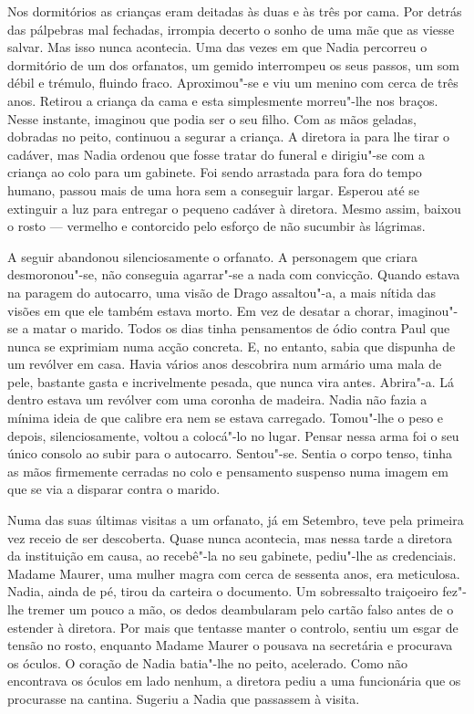 Nos dormitórios as crianças eram deitadas às duas e às três por cama.
Por detrás das pálpebras mal fechadas, irrompia decerto o sonho de uma
mãe que as viesse salvar. Mas isso nunca acontecia. Uma das vezes em que
Nadia percorreu o dormitório de um dos orfanatos, um gemido interrompeu
os seus passos, um som débil e trémulo, fluindo fraco. Aproximou"-se e
viu um menino com cerca de três anos. Retirou a criança da cama e esta
simplesmente morreu"-lhe nos braços. Nesse instante, imaginou que podia
ser o seu filho. Com as mãos geladas, dobradas no peito, continuou a
segurar a criança. A diretora ia para lhe tirar o cadáver, mas Nadia
ordenou que fosse tratar do funeral e dirigiu"-se com a criança ao colo
para um gabinete. Foi sendo arrastada para fora do tempo humano,
passou mais de uma hora sem a conseguir largar. Esperou até se extinguir
a luz para entregar o pequeno cadáver à diretora. Mesmo assim, baixou o
rosto --- vermelho e contorcido pelo esforço de não sucumbir às lágrimas.

A seguir abandonou silenciosamente o orfanato. A personagem que criara desmoronou"-se, não conseguia agarrar"-se a nada com
convicção. Quando estava na paragem do autocarro, uma visão de Drago
assaltou"-a, a mais
nítida das visões em que ele também estava morto. Em vez de desatar a
chorar, imaginou"-se a matar o marido. Todos os dias tinha pensamentos de
ódio contra Paul que nunca se exprimiam numa acção concreta. E, no
entanto, sabia que dispunha de um revólver em casa. Havia vários anos
descobrira num armário uma mala de pele, bastante gasta e incrivelmente
pesada, que nunca vira antes. Abrira"-a. Lá dentro estava um revólver com
uma coronha de madeira. Nadia não fazia a mínima ideia de que calibre
era nem se estava carregado. Tomou"-lhe o peso e depois, silenciosamente, voltou a colocá"-lo no lugar. Pensar nessa arma foi o seu único
consolo ao subir para o autocarro. Sentou"-se. Sentia o corpo tenso,
tinha as mãos firmemente cerradas no colo e pensamento suspenso numa
imagem em que se via a disparar contra o marido.

Numa das suas últimas visitas a um orfanato, já em
Setembro, teve pela primeira vez receio de ser descoberta. Quase nunca
acontecia, mas nessa tarde a diretora da instituição em causa, ao
recebê"-la no seu gabinete, pediu"-lhe as credenciais. Madame Maurer, uma
mulher magra com cerca de sessenta anos, era meticulosa. Nadia, ainda de
pé, tirou da carteira o documento. Um sobressalto traiçoeiro fez"-lhe
tremer um pouco a mão, os dedos deambularam pelo cartão falso antes de o
estender à diretora. Por mais que tentasse manter o controlo, sentiu um
esgar de tensão no rosto, enquanto Madame Maurer o pousava na secretária e procurava os óculos. O coração de Nadia batia"-lhe no peito,
acelerado. Como não encontrava os óculos em lado nenhum, a diretora
pediu a uma funcionária que os procurasse na cantina. Sugeriu a Nadia
que passassem à visita.

